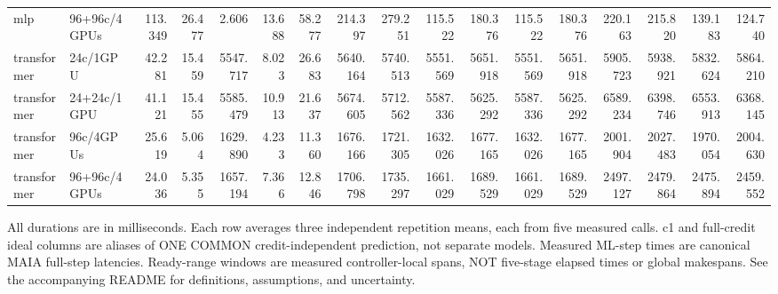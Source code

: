 \begin{landscape}
\begin{table}[p]
{\begin{tabular}{llrrrrrrrrrrrrrrr}
mlp & 96+96c/4GPUs & 113.349 & 26.477 & 2.606 & 13.688 & 58.277 & 214.397 & 279.251 & 115.522 & 180.376 & 115.522 & 180.376 & 220.163 & 215.820 & 139.183 & 124.740 \\
transformer & 24c/1GPU & 42.281 & 15.459 & 5547.717 & 8.023 & 26.683 & 5640.164 & 5740.513 & 5551.569 & 5651.918 & 5551.569 & 5651.918 & 5905.723 & 5938.921 & 5832.624 & 5864.210 \\
transformer & 24+24c/1GPU & 41.121 & 15.455 & 5585.479 & 10.913 & 21.637 & 5674.605 & 5712.562 & 5587.336 & 5625.292 & 5587.336 & 5625.292 & 6589.234 & 6398.746 & 6553.913 & 6368.145 \\
transformer & 96c/4GPUs & 25.619 & 5.064 & 1629.890 & 4.233 & 11.360 & 1676.166 & 1721.305 & 1632.026 & 1677.165 & 1632.026 & 1677.165 & 2001.904 & 2027.483 & 1970.054 & 2004.630 \\
transformer & 96+96c/4GPUs & 24.036 & 5.355 & 1657.194 & 7.366 & 12.846 & 1706.798 & 1735.297 & 1661.029 & 1689.529 & 1661.029 & 1689.529 & 2497.127 & 2479.864 & 2475.894 & 2459.552 \\
\bottomrule
\end{tabular}%
}
\par\smallskip
\begin{minipage}{\linewidth}\footnotesize
All durations are in milliseconds. Each row averages three independent
repetition means, each from five measured calls. c1 and full-credit ideal columns
are aliases of ONE COMMON credit-independent prediction, not separate models.
Measured ML-step times are canonical MAIA full-step latencies. Ready-range windows
are measured controller-local spans, NOT five-stage elapsed times or global
makespans. See the accompanying README for definitions, assumptions, and uncertainty.
\end{minipage}
\end{table}
\end{landscape}
